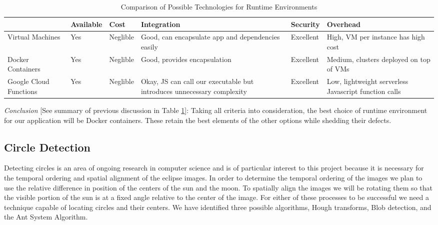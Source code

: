 \documentclass[10pt, onecolumn, draftclsnofoot, letterpaper, compsoc]{IEEEtran}
\begin{document}
\begin{table}[h]
\centering
\caption{Comparison of Possible Technologies for Runtime Environments}
\begin{tabular}{|p{2.1cm}|p{2.1cm}|p{2.1cm}|p{2.1cm}|p{2.1cm}|p{2.1cm}|}
\cline{4-4}

\hline  & Available & Cost & Integration & Security & Overhead \\ \hline

Virtual Machines & Yes & Neglible & Good, can encapsulate app and dependencies
easily &  Excellent & High, VM per instance has high cost  \\ \hline

Docker Containers  & Yes & Neglible & Good, provides encapsulation &  Excellent
& Medium, clusters deployed on top of VMs  \\ \hline

Google Cloud Functions  & Yes & Neglible & Okay, JS can call our executable but
introduces unnecessary complexity & Excellent & Low, lightweight serverless
Javascript function calls  \\ \hline

\end{tabular}
\label{table:george2}
\end{table}

\textit{Conclusion} [See summary of previous discussion in Table
\ref{table:george2}]: Taking all criteria into consideration, the best choice of runtime environment
for our application will be Docker containers. These retain the best elements of
the other options while shedding their defects. \\

\subsection{Circle Detection}

Detecting circles is an area of ongoing research in computer science and is of
particular interest to this project because it is necessary for the temporal
ordering and spatial alignment of the eclipse images. In order to determine the
temporal ordering of the images we plan to use the relative difference in
position of the centers of the sun and the moon. To spatially align the images
we will be rotating them so that the visible portion of the sun is at a fixed
angle relative to the center of the image. For either of these processes to be
successful we need a technique capable of locating circles and their centers. We
have identified three possible algorithms, Hough transforms, Blob detection, and
the Ant System Algorithm. \\
\end{document}
